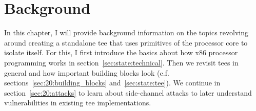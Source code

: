 \chapter{Background}
\label{sec:state}






In this chapter, I will provide background information on the topics revolving
around creating a standalone \gls{tee} that uses primitives of the processor
core to isolate itself. For this, I first introduce the basics about how x86
processor programming works in section~\ref{sec:state:technical}. Then we
revisit \glspl{tee} in general and how important building blocks look (c.f.
sections~\ref{sec:20:building_blocks} and~\ref{sec:state:tee}). We continue in
section~\ref{sec:20:attacks} to learn about side-channel attacks to later
understand vulnerabilities in existing \gls{tee} implementations.





